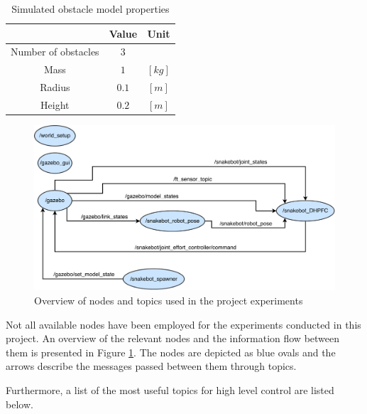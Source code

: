 \begin{table}[h!]
    \centering
    \begin{tabular}{|c|c|c|}
        \hline
        & \textbf{Value} & \textbf{Unit}\\
        \hline \hline
        Number of obstacles & $3$ & \\
        Mass & $1$ & $[kg]$ \\
        Radius & $0.1$ & $[m]$ \\
        Height & $0.2$ & $[m]$ \\
        \hline
    \end{tabular}
    \caption{Simulated obstacle model properties}
    \label{tab:obst_model_props}
\end{table}

\begin{figure}[h!]
    \centering
    \includegraphics[width=\textwidth]{figures/simulator/proj_nodes.pdf}
    \caption{Overview of nodes and topics used in the project experiments}
    \label{fig:proj_nodes}
\end{figure}

Not all available nodes have been employed for the experiments conducted in this project. An overview of the relevant nodes and the information flow between them is presented in Figure \ref{fig:proj_nodes}. The nodes are depicted as blue ovals and the arrows describe the messages passed between them through topics.

Furthermore, a list of the most useful topics for high level control are listed below.

